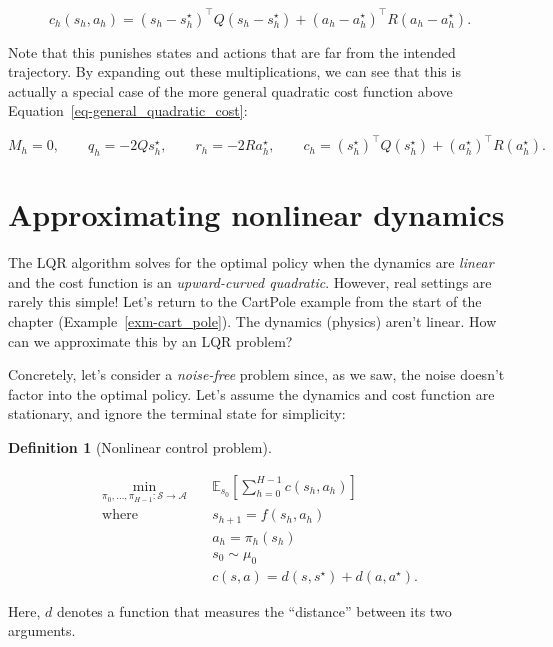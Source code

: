 \documentclass[
  letterpaper,
  DIV=11,
  numbers=noendperiod]{scrreprt}
\theoremstyle{plain}
\theoremstyle{plain}
\theoremstyle{definition}
\theoremstyle{definition}
\newtheorem{definition}{Definition}[chapter]
\theoremstyle{remark}
\begin{document}
\[
c_h(s_h, a_h) = (s_h- s^\star_h)^\top Q (s_h- s^\star_h) + (a_h- a^\star_h)^\top R (a_h- a^\star_h).
\]

Note that this punishes states and actions that are far from the
intended trajectory. By expanding out these multiplications, we can see
that this is actually a special case of the more general quadratic cost
function above Equation~\ref{eq-general_quadratic_cost}:

\[
M_h= 0, \qquad q_h= -2Q s^\star_h, \qquad r_h= -2R a^\star_h, \qquad c_h= (s^\star_h)^\top Q (s^\star_h) + (a^\star_h)^\top R (a^\star_h).
\]

\section{Approximating nonlinear dynamics}\label{sec-approx_nonlinear}

The LQR algorithm solves for the optimal policy when the dynamics are
\emph{linear} and the cost function is an \emph{upward-curved
quadratic}. However, real settings are rarely this simple! Let's return
to the CartPole example from the start of the chapter
(Example~\ref{exm-cart_pole}). The dynamics (physics) aren't linear. How
can we approximate this by an LQR problem?

Concretely, let's consider a \emph{noise-free} problem since, as we saw,
the noise doesn't factor into the optimal policy. Let's assume the
dynamics and cost function are stationary, and ignore the terminal state
for simplicity:

\begin{definition}[Nonlinear control
problem]\protect\hypertarget{def-nonlinear_control}{}\label{def-nonlinear_control}

\[
\begin{aligned}
        \min_{\pi_0, \dots, \pi_{H-1} : \mathcal{S} \to \mathcal{A}} \quad & \mathbb{E}_{s_0} \left[ \sum_{h=0}^{H-1} c(s_h, a_h) \right] \\
        \text{where} \quad                                  & s_{h+1} = f(s_h, a_h)                                   \\
                                                            & a_h= \pi_h(s_h)                                          \\
                                                            & s_0 \sim \mu_0                                                     \\
                                                            & c(s, a) = d(s, s^\star) + d(a, a^\star).
\end{aligned}
\]

Here, \(d\) denotes a function that measures the ``distance'' between
its two arguments.

\end{definition}
\end{document}
